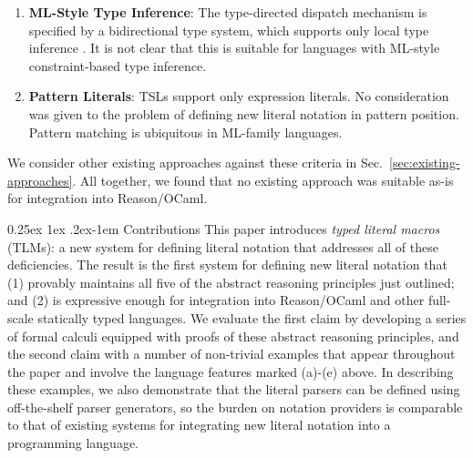 \documentclass[acmsmall,review,anonymous]{acmart}\settopmatter{printfolios=true,printccs=false,printacmref=false}
\makeatletter
\renewcommand{\paragraph}{%
  \@startsection{paragraph}{4}%
  {\z@}{0.25ex \@plus 1ex \@minus .2ex}{-1em}%
  {\normalfont\normalsize\bfseries}%
}
\makeatother
\begin{document}
\begin{enumerate}[leftmargin=12px]
\begin{enumerate}[leftmargin=15px]
  \item \textbf{ML-Style Type Inference}: The type-directed dispatch mechanism is specified by a bidirectional type system, which supports only local type inference \cite{Pierce:2000:LTI:345099.345100}. It is not clear that this is suitable for languages with ML-style constraint-based type inference.
  \item \textbf{Pattern Literals}: TSLs support only expression literals. No consideration was given to the problem of defining new literal notation in pattern position. Pattern matching is ubiquitous in ML-family languages. %
\end{enumerate}
\end{enumerate}
We consider other existing approaches against these criteria in Sec.~\ref{sec:existing-approaches}. All together, we found that no existing approach was suitable as-is for integration into Reason/OCaml.

\paragraph{Contributions} This paper introduces \emph{typed literal macros} (TLMs): a new system for defining literal notation that addresses all of these deficiencies. The result is the first system for defining new literal notation that (1) provably maintains all five of the abstract reasoning principles just outlined; and (2) is expressive enough for integration into Reason/OCaml and other full-scale statically typed languages. We evaluate the first claim by developing a series of formal calculi equipped with proofs of these abstract reasoning principles, and the second claim with a number of non-trivial examples that appear throughout the paper and involve the language features marked {(a)-(e)} above. In describing these examples, we also demonstrate that the literal parsers can be defined using off-the-shelf parser generators, so the burden on notation providers is comparable to that of existing systems for integrating new literal notation into a programming language.

\end{document}
